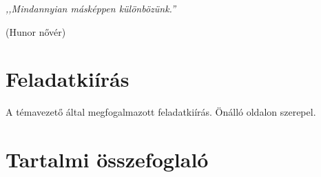 \documentclass[12pt]{report}
\theoremstyle{definition}
\begin{document}
    \onehalfspacing



    \clearpage
    \thispagestyle{empty}
    {
    \setlength\epigraphrule{0pt}
    \linespread{1.0}\epigraph{\small\emph{
    ,,Mindannyian másképpen különbözünk.''}}
    {\small(Hunor nővér)}
    }



    \tableofcontents



    \chapter*{Feladatkiírás}

A témavezető által megfogalmazott feladatkiírás. Önálló oldalon szerepel.



    \chapter*{Tartalmi összefoglaló}

\end{document}

